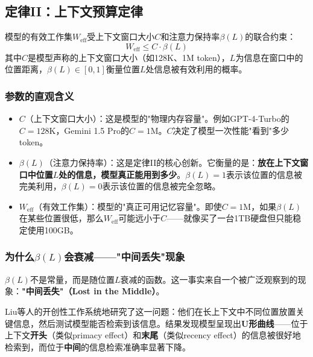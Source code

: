 \subsection{定律II：上下文预算定律}
\label{sec:law2}

\begin{law}[上下文预算定律]
模型的有效工作集$W_{\mathrm{eff}}$受上下文窗口大小$C$和注意力保持率$\beta(L)$的联合约束：
\begin{equation}
\label{eq:context}
W_{\mathrm{eff}} \leq C \cdot \beta(L)
\end{equation}
其中$C$是模型声称的上下文窗口大小（如128K、1M token），$L$为信息在窗口中的位置距离，$\beta(L) \in [0,1]$衡量位置$L$处信息被有效利用的概率。
\end{law}

\subsubsection{参数的直观含义}

\begin{itemize}[nosep]
\item $C$（上下文窗口大小）：这是模型的"物理内存容量"。例如GPT-4-Turbo的$C = 128\mathrm{K}$，Gemini 1.5 Pro的$C = 1\mathrm{M}$。$C$决定了模型一次性能"看到"多少token。
\item $\beta(L)$（注意力保持率）：这是定律II的核心创新。它衡量的是：\textbf{放在上下文窗口中位置$L$处的信息，模型真正能用到多少}。$\beta(L) = 1$表示该位置的信息被完美利用，$\beta(L) = 0$表示该位置的信息被完全忽略。
\item $W_{\mathrm{eff}}$（有效工作集）：模型的"真正可用记忆容量"。即使$C = 1\mathrm{M}$，如果$\beta(L)$在某些位置很低，那么$W_{\mathrm{eff}}$可能远小于$C$——就像买了一台1TB硬盘但只能稳定使用100GB。
\end{itemize}

\subsubsection{为什么$\beta(L)$会衰减——"中间丢失"现象}

$\beta(L)$不是常量，而是随位置$L$衰减的函数。这一事实来自一个被广泛观察到的现象：\textbf{"中间丢失"（Lost in the Middle）}。

Liu等人的开创性工作系统地研究了这一问题\cite{liu2023lostmiddle}：他们在长上下文中不同位置放置关键信息，然后测试模型能否检索到该信息。结果发现模型呈现出\textbf{U形曲线}——位于上下文\textbf{开头}（类似primacy effect）和\textbf{末尾}（类似recency effect）的信息被很好地检索到，而位于\textbf{中间}的信息检索准确率显著下降。

